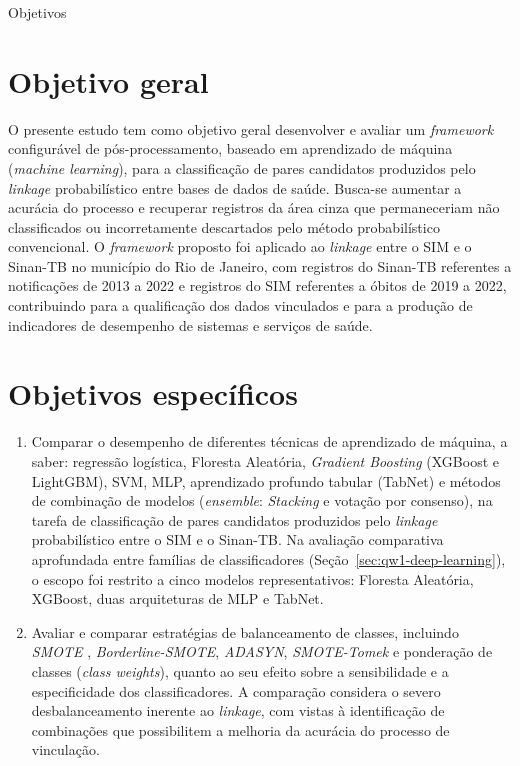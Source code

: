 \begin{chapter}{Objetivos}\label{cap:objetivos}

\section{Objetivo geral}\label{sec:objetivo-geral}

O presente estudo tem como objetivo geral desenvolver e avaliar um \textit{framework} configurável de pós-processamento, baseado em aprendizado de máquina (\textit{machine learning}), para a classificação de pares candidatos produzidos pelo \textit{linkage} probabilístico entre bases de dados de saúde. Busca-se aumentar a acurácia do processo e recuperar registros da área cinza que permaneceriam não classificados ou incorretamente descartados pelo método probabilístico convencional. O \textit{framework} proposto foi aplicado ao \textit{linkage} entre o SIM e o Sinan-TB no município do Rio de Janeiro, com registros do Sinan-TB referentes a notificações de 2013 a 2022 e registros do SIM referentes a óbitos de 2019 a 2022, contribuindo para a qualificação dos dados vinculados e para a produção de indicadores de desempenho de sistemas e serviços de saúde.

\section{Objetivos específicos}\label{sec:objetivos-especificos}

\begin{enumerate}

\item Comparar o desempenho de diferentes técnicas de aprendizado de máquina, a saber: regressão logística, Floresta Aleatória, \textit{Gradient Boosting} (XGBoost e LightGBM), SVM, MLP, aprendizado profundo tabular (TabNet) e métodos de combinação de modelos (\textit{ensemble}: \textit{Stacking} e votação por consenso), na tarefa de classificação de pares candidatos produzidos pelo \textit{linkage} probabilístico entre o SIM e o Sinan-TB. Na avaliação comparativa aprofundada entre famílias de classificadores (Seção~\ref{sec:qw1-deep-learning}), o escopo foi restrito a cinco modelos representativos: Floresta Aleatória, XGBoost, duas arquiteturas de MLP e TabNet.

\item Avaliar e comparar estratégias de balanceamento de classes, incluindo \textit{SMOTE} \cite{Chawla2002smote}, \textit{Borderline-SMOTE}, \textit{ADASYN}, \textit{SMOTE-Tomek} e ponderação de classes (\textit{class weights}), quanto ao seu efeito sobre a sensibilidade e a especificidade dos classificadores. A comparação considera o severo desbalanceamento inerente ao \textit{linkage}, com vistas à identificação de combinações que possibilitem a melhoria da acurácia do processo de vinculação.


\end{enumerate}
\end{chapter}
